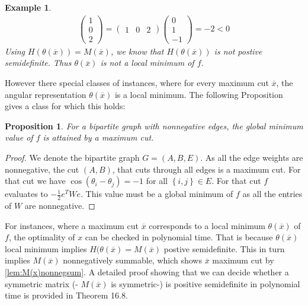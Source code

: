 \documentclass[12pt,a4paper]{article}
\theoremstyle{mythm}
\newtheorem{prop}[thm]{Proposition}
\newtheorem*{exa}{Example}
\begin{document}
\begin{exa}
\begin{align*}
\begin{pmatrix}
1 \\ 
0 \\
2
\end{pmatrix} 
= 
\begin{pmatrix}
1 & 0 & 2
\end{pmatrix} 
\begin{pmatrix}
0 \\
1 \\ 
-1
\end{pmatrix} 
= -2 < 0
\end{align*} 
Using $ H ( \theta ( \overline{ x } ) )= M ( \overline{ x } ) $, we know that $ H ( \theta ( \overline{ x } ) ) $ is not postive semidefinite. Thus $ \theta ( \overline{ x } )
$ is not a local minimum of $ f $.
\end{exa} 
However there special classes of instances, where for every maximum cut $ \overline{ x }  $, the angular representation $ \theta ( \overline{ x } ) $ is a local minimum. 
The following Proposition gives a class for which this holds:
\begin{prop}
For a bipartite graph with nonnegative edges, the global minimum value of $ f $ is attained by a maximum cut.
\end{prop} 
\begin{proof}
We denote the bipartite graph $ G = \left( A,B,E \right)  $.
As all the edge weights are nonnegative, the cut $ ( A, B) $, that cuts through all edges is a maximum cut.
For that cut we have $ \cos( \theta _{ i } - \theta _j ) = -1 $ for all $ \left\{ i,j \right\} \in E $.
For that cut $ f $ evaluates to $ - \frac{ 1 }{ 2 } e ^T W e  $.
This value must be a global minimum of $ f $ as all the entries of $ W $ are nonnegative.
\end{proof}
For instances, where a maximum cut $ \overline{ x }  $ corresponds to a local minimum $ \theta ( \overline{ x } ) $ of $ f $, the optimality of $ x $ can be
checked in polynomial time. That is because $ \theta ( \overline{ x } ) $ local minimum implies $ H ( \theta ( \overline{ x } ) = M ( \overline{ x } ) $ postive
semidefinite. This in turn implies $ M ( \overline{ x } )  $ nonnegatively summable, which shows $ \overline{ x }  $ maximum cut by \ref{lem:M(x)nonnegsum}. 
A detailed proof showing that we can decide whether a symmetric matrix (- $ M ( \overline{ x } ) $ is symmetric-) is positive semidefinite in polynomial time is provided in \cite{Korte2018} Theorem 16.8.
\end{document}
